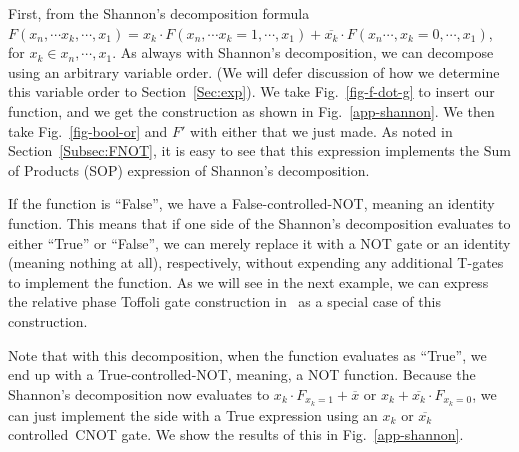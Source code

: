 First, from the Shannon's decomposition
formula $F(x_n,\cdots x_k,\cdots,x_1) = x_{k} \cdot F(x_n,\cdots x_k=1,\cdots,x_1) + \overline{x_k} \cdot F(x_n\cdots,x_k=0,\cdots,x_1)$, for $x_k \in {x_n,\cdots,x_1}$. As always with
Shannon's decomposition, we can decompose using an arbitrary variable order. (We will defer discussion of how we
determine this variable order to Section~\ref{Sec:exp}). We take Fig.~\ref{fig-f-dot-g} to insert our function, and
we get the construction as shown in Fig.~\ref{app-shannon}. We then take Fig.~\ref{fig-bool-or} and $F'$ with either  that we just made. As noted in
Section~\ref{Subsec:FNOT}, it is easy to see that this expression implements the Sum of Products (SOP) expression
of Shannon's decomposition. 


If the function is ``False'', we have a False-controlled-NOT, meaning an identity function. This means that if one side of
the Shannon's decomposition evaluates to either ``True'' or ``False'', we can merely replace it with a NOT gate or an
identity (meaning nothing at all), respectively, without expending any additional T-gates to implement the
function. As we will see in the next example, we can express the relative phase Toffoli gate construction
in~\cite{bib-amy-phase-state} as a special case of this construction.

Note that with this decomposition, when the function evaluates as ``True'', we end up with a True-controlled-NOT,
meaning, a NOT function. Because the Shannon's decomposition now evaluates to $x_k \cdot F_{x_k=1} + \overline{x}$ or
$x_k + \overline{x_k} \cdot F_{x_k=0}$, we can just implement the side with a True expression using an $x_k$ or
$\overline{x_k}$ controlled~CNOT gate. We show the results of this in Fig.~\ref{app-shannon}.

